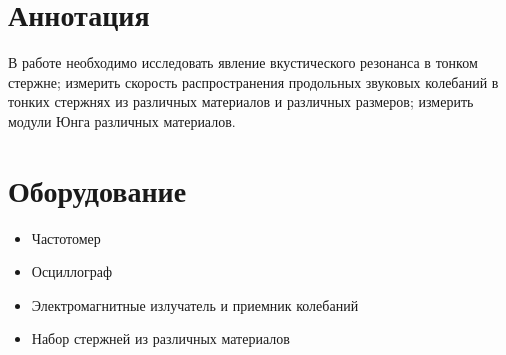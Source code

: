 \section*{Аннотация}
\normalsize{    В работе необходимо исследовать явление вкустического резонанса
в тонком стержне; измерить скорость распространения продольных 
звуковых колебаний в тонких стержнях из различных материалов
и различных размеров; измерить модули Юнга различных материалов.}
\section*{Оборудование}
\begin{itemize}
    \item\normalsize{Частотомер}
    \item\normalsize{Осциллограф}
    \item\normalsize{Электромагнитные излучатель и приемник колебаний}
    \item\normalsize{Набор стержней из различных материалов}
\end{itemize}

